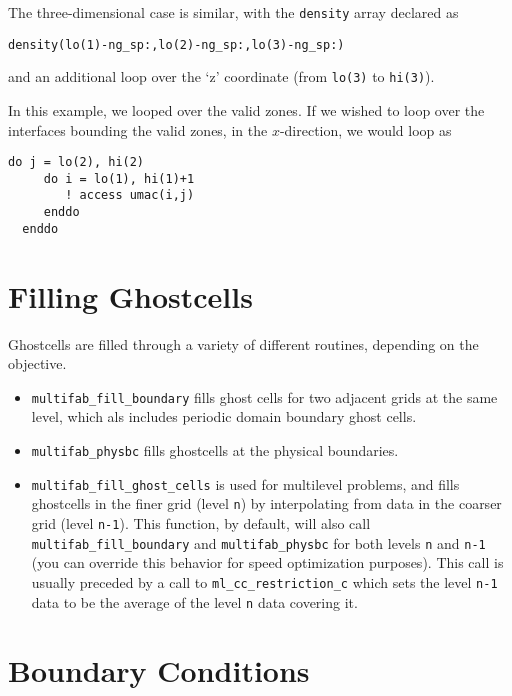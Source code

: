 The three-dimensional case is similar, with the {\tt density} array
declared as 
\begin{lstlisting}[language={[95]fortran},mathescape=false]
  density(lo(1)-ng_sp:,lo(2)-ng_sp:,lo(3)-ng_sp:)
\end{lstlisting}
and an additional loop over the `z' coordinate (from {\tt lo(3)} to
{\tt hi(3)}).

In this example, we looped over the valid zones.  If we wished to loop
over the interfaces bounding the valid zones, in the $x$-direction,
we would loop as
\begin{lstlisting}[language={[95]fortran},mathescape=false]
  do j = lo(2), hi(2)
     do i = lo(1), hi(1)+1
        ! access umac(i,j)
     enddo
  enddo
\end{lstlisting}


\section{Filling Ghostcells}

Ghostcells are filled through a variety of different routines, depending
on the objective.

\begin{itemize}

\item {\tt multifab\_fill\_boundary} fills ghost cells for two
  adjacent grids at the same level, which als includes periodic domain
  boundary ghost cells.

\item {\tt multifab\_physbc} fills ghostcells at the physical boundaries.

\item {\tt multifab\_fill\_ghost\_cells} is used for multilevel
  problems, and fills ghostcells in the finer grid (level {\tt n}) by
  interpolating from data in the coarser grid (level {\tt n-1}).
  This function, by default, will also call {\tt multifab\_fill\_boundary}
  and {\tt multifab\_physbc} for both levels {\tt n} and {\tt n-1} (you 
  can override this behavior for speed optimization purposes).
  This call is usually preceded by a call to 
  {\tt ml\_cc\_restriction\_c} which sets the level {\tt n-1} data to be
  the average of the level {\tt n} data covering it.
   

\end{itemize}

\section{Boundary Conditions}


